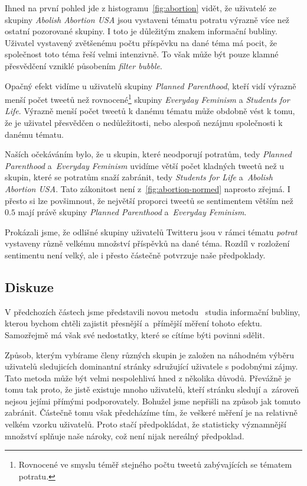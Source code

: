 \documentclass[12pt, a4paper]{article}
\numberwithin{equation}{section} 	%
\begin{document}
Ihned na první pohled jde z histogramu~\autoref{fig:abortion} vidět, že uživatelé ze skupiny \textit{Abolish Abortion USA} jsou vystaveni tématu potratu výrazně více než ostatní pozorované skupiny. I toto je důležitým znakem informační bubliny. Uživatel vystavený zvětšenému počtu příspěvku na dané téma má pocit, že společnost toto téma řeší velmi intenzivně. To však může být pouze klamné přesvědčení vzniklé působením \textit{filter bubble}.

Opačný efekt vidíme u uživatelů skupiny \textit{Planned Parenthood}, kteří vidí výrazně menší počet tweetů než rovnocené\footnote{Rovnocené ve smyslu téměř stejného počtu tweetů zabývajících se tématem potratu.} skupiny \textit{Everyday Feminism} a \textit{Students for Life}. Výrazně menší počet tweetů k danému tématu může obdobně vést k tomu, že je uživatel přesvědčen o nedůležitosti, nebo alespoň nezájmu společnosti k danému tématu.

Naších očekáváním bylo, že u skupin, které neodporují potratům, tedy \textit{Planned Parenthood} a~\textit{Everyday Feminism} uvidíme větší počet kladných tweetů než u skupin, které se potratům snaží zabránit, tedy \textit{Students for Life} a~\textit{Abolish Abortion USA}. Tato zákonitost není z~\autoref{fig:abortion-normed} naprosto zřejmá. I přesto si lze povšimnout, že největší proporci tweetů se sentimentem větším než $0.5$ mají právě skupiny \textit{Planned Parenthood} a~\textit{Everyday Feminism}.

Prokázali jsme, že odlišné skupiny uživatelů Twitteru jsou v rámci tématu \textit{potrat} vystaveny různě velkému množství příspěvků na dané téma. Rozdíl v rozložení sentimentu není velký, ale i přesto částečně potvrzuje naše předpoklady.

\subsection{Diskuze}
\noindent V předchozích částech jsme představili novou metodu~\cite{myRepo} studia informační bubliny, kterou bychom chtěli zajistit přesnější a~přímější měření tohoto efektu. Samozřejmě má však své nedostatky, které se cítíme býti povinni sdělit.

Způsob, kterým vybírame členy různých skupin je založen na náhodném vý\-bě\-ru uživatelů sledujicích dominantní stránky sdružující uživatele s podobnými zájmy. Tato metoda může být velmi nespolehlivá hned z několika důvodů. Pře\-váž\-ně je tomu tak proto, že jistě existuje mnoho uživatelů, kteří stránku sledují a~zároveň nejsou jejími přímými podporovately. Bohužel jsme nepřišli na způsob jak tomuto zabránit. Částečně tomu však předcházíme tím, že veškeré měření je na relativně velkém vzorku uživatelů. Proto stačí předpokládat, že statisticky významnější množství splňuje naše nároky, což není nijak nereálný předpoklad.
\end{document}
